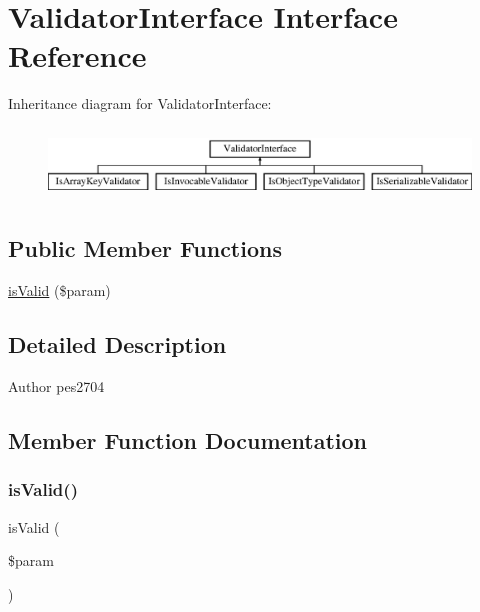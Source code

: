 \hypertarget{interface_pes_1_1_validator_1_1_validator_interface}{}\section{Validator\+Interface Interface Reference}
\label{interface_pes_1_1_validator_1_1_validator_interface}
Inheritance diagram for Validator\+Interface\+:\begin{figure}[H]
\begin{center}
\leavevmode
\includegraphics[height=1.917808cm]{interface_pes_1_1_validator_1_1_validator_interface}
\end{center}
\end{figure}
\subsection*{Public Member Functions}
\begin{DoxyCompactItemize}
\item 
\mbox{\hyperlink{interface_pes_1_1_validator_1_1_validator_interface_a250dbda694ce9c4d0dd4e71e1df35882}{is\+Valid}} (\$param)
\end{DoxyCompactItemize}


\subsection{Detailed Description}
\begin{DoxyAuthor}{Author}
pes2704 
\end{DoxyAuthor}


\subsection{Member Function Documentation}
\mbox{\label{interface_pes_1_1_validator_1_1_validator_interface_a250dbda694ce9c4d0dd4e71e1df35882}} 
\subsubsection{\texorpdfstring{is\+Valid()}{isValid()}}
{\footnotesize\ttfamily is\+Valid (\begin{DoxyParamCaption}\item[{}]{\$param }\end{DoxyParamCaption})}


